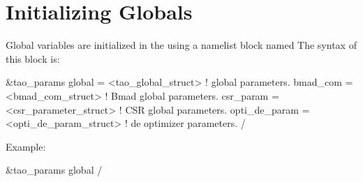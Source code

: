 {%
\section{Initializing Globals}
\label{s:globals} 

Global variables are initialized in the  using a
namelist block named  The syntax of this block is:
\begin{example}
  &tao_params
    global        = <tao_global_struct>     ! global parameters.
    bmad_com      = <bmad_com_struct>       ! Bmad global parameters.
    csr_param     = <csr_parameter_struct>  ! CSR global parameters.
    opti_de_param = <opti_de_param_struct>  ! de optimizer parameters.
  /
\end{example}
Example:
\begin{example}
  &tao_params
    global%
  /
\end{example}

}
